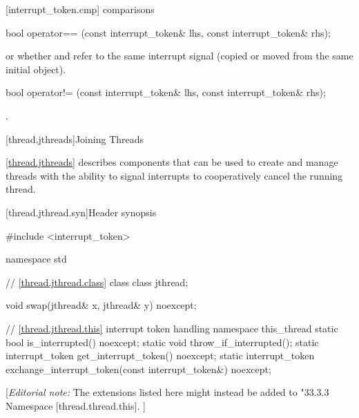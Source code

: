{%
[interrupt_token.cmp]{ comparisons}

%
\begin{itemdecl}
bool operator== (const interrupt_token& lhs, const interrupt_token& rhs);
\end{itemdecl}
\begin{itemdescr}
  \pnum\returns {} or
                whether  and  refer to the
                same interrupt signal
                (copied or moved from the same initial  object).
\end{itemdescr}

%
\begin{itemdecl}
bool operator!= (const interrupt_token& lhs, const interrupt_token& rhs);
\end{itemdecl}
\begin{itemdescr}
  \pnum\returns {}.
\end{itemdescr}


\clearpage

[thread.jthreads]{Joining Threads}


\pnum
\ref{thread.jthreads} describes components that can be used to create and manage threads
with the ability to signal interrupts to cooperatively cancel the running thread.

[thread.jthread.syn]{Header  synopsis}
%

\begin{codeblock}
#include <interrupt_token>

namespace std {
  // \ref{thread.jthread.class} class 
  class jthread;

  void swap(jthread& x, jthread& y) noexcept;

  // \ref{thread.jthread.this}  interrupt token handling
  namespace this_thread {
    static bool is_interrupted() noexcept;
    static void throw_if_interrupted();
    static interrupt_token get_interrupt_token() noexcept;
    static interrupt_token exchange_interrupt_token(const interrupt_token&) noexcept;
  }
}
\end{codeblock}

{\color{blue}
[{\itshape{}Editorial note:} The  extensions listed here might instead be added
        to "33.3.3 Namespace  [thread.thread.this]. ]
}

}

